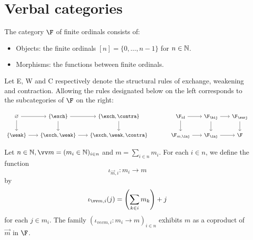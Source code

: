 \documentclass[11pt]{article}
\begin{document}
\section{Verbal categories}

\begin{example}
  \label{ex:finite_ordinals_category}
  The category $\F$ of finite ordinals consists of:
  \begin{itemize}
    \item Objects: the finite ordinals $[n] = \{0, \dots, n-1\}$ for $n \in \mathbb N$.
    \item Morphisms: the functions between finite ordinals.
  \end{itemize}

  Let E, W and C respectively denote the structural rules of exchange, weakening and contraction. Allowing the rules designated below on the left corresponds to the subcategories of $\F$ on the right:

  \[\begin{tikzcd}[column sep=scriptsize]
    \varnothing & {\{\exch\}} & {\{\exch, \contra\}} && {\F_\id} & {\F_\bij} & {\F_\surj} \\
    {\{\weak\}} & {\{\exch, \weak\}} & {\{\exch, \weak, \contra\}} && {\F_{m, \inj}} & {\F_\inj} & \F
    \arrow[from=1-1, to=1-2]
    \arrow[from=1-1, to=2-1]
    \arrow[from=1-2, to=1-3]
    \arrow[from=1-2, to=2-2]
    \arrow[from=1-3, to=2-3]
    \arrow[from=1-5, to=1-6]
    \arrow[from=1-5, to=2-5]
    \arrow[from=1-6, to=1-7]
    \arrow[from=1-6, to=2-6]
    \arrow[from=1-7, to=2-7]
    \arrow[from=2-1, to=2-2]
    \arrow[from=2-2, to=2-3]
    \arrow[from=2-5, to=2-6]
    \arrow[from=2-6, to=2-7]
  \end{tikzcd}\]
\end{example}

\begin{definition}
  Let $n \in \N, \vec m = (m_i \in \N)_{i \in n}$ and $m = \sum_{i \in n} m_i$. For each $i \in n$, we define the function \[\iota_{\vec m, i} : m_i \to m\] by \[\iota_{\vec m, i} (j) = \lp \sum_{k \in i} m_k\rp + j\] for each $j \in m_i$. The family $(\iota_{vec m, i} : m_i \to m)_{i \in n}$ exhibits $m$ as a coproduct of $\vec m$ in $\F$.
\end{definition}
\end{document}
